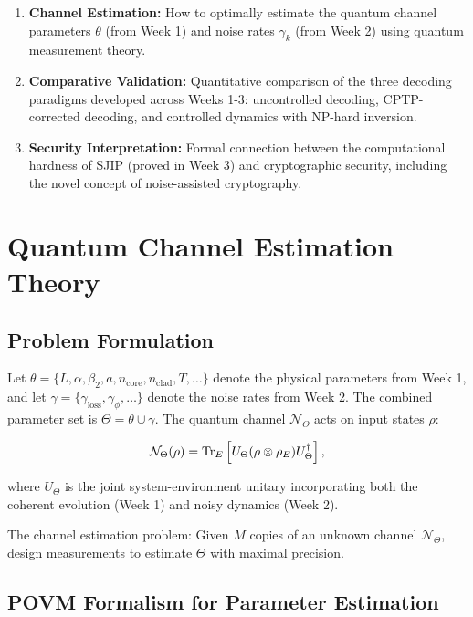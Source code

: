 \documentclass[12pt]{article}
\newcommand{\calN}{\mathcal{N}}
\begin{document}
\begin{enumerate}
    \item \textbf{Channel Estimation:} How to optimally estimate the quantum channel parameters \(\theta\) (from Week 1) and noise rates \(\gamma_k\) (from Week 2) using quantum measurement theory.
    \item \textbf{Comparative Validation:} Quantitative comparison of the three decoding paradigms developed across Weeks 1-3: uncontrolled decoding, CPTP-corrected decoding, and controlled dynamics with NP-hard inversion.
    \item \textbf{Security Interpretation:} Formal connection between the computational hardness of SJIP (proved in Week 3) and cryptographic security, including the novel concept of noise-assisted cryptography.
\end{enumerate}

\section{Quantum Channel Estimation Theory}

\subsection{Problem Formulation}

Let \(\theta = \{L, \alpha, \beta_2, a, n_{\text{core}}, n_{\text{clad}}, T, \dots\}\) denote the physical parameters from Week 1, and let \(\gamma = \{\gamma_{\text{loss}}, \gamma_\phi, \dots\}\) denote the noise rates from Week 2. The combined parameter set is \(\Theta = \theta \cup \gamma\). The quantum channel \(\calN_\Theta\) acts on input states \(\rho\):

\begin{equation}
    \calN_\Theta(\rho) = \Tr_E\left[U_\Theta(\rho \otimes \rho_E)U_\Theta^\dagger\right],
\end{equation}

where \(U_\Theta\) is the joint system-environment unitary incorporating both the coherent evolution (Week 1) and noisy dynamics (Week 2).

The channel estimation problem: Given \(M\) copies of an unknown channel \(\calN_\Theta\), design measurements to estimate \(\Theta\) with maximal precision.

\subsection{POVM Formalism for Parameter Estimation}
\end{document}
